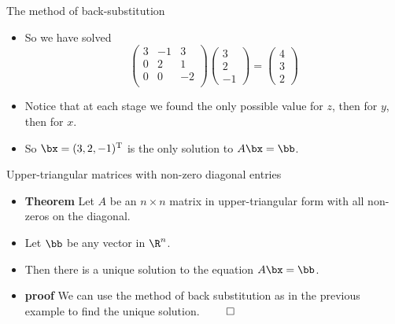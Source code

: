 \documentclass{beamer}
\begin{document}
\begin{frame}{The method of back-substitution}

\begin{itemize}
\item So we have solved
$$
\begin{pmatrix}
3 & -1  & 3 \\
0 & 2  & 1 \\
0 & 0 & -2 \\
\end{pmatrix}
\begin{pmatrix}
3 \\ 2 \\ -1
\end{pmatrix}
=
\begin{pmatrix}
4 \\ 3 \\ 2
\end{pmatrix}
$$
\item Notice that at each stage we found the only possible value for $z$,
then for $y$, then for $x$.
\item So $\bx=(3,2,-1)^{\text{T}}$ is the only solution to $A\bx=\bb$.
\end{itemize}
\end{frame}

\begin{frame}{Upper-triangular matrices with non-zero diagonal entries}

\begin{itemize}
\item \textbf{Theorem} Let $A$ be an $n\times n$ matrix in upper-triangular
form with all non-zeros on the diagonal.
\item Let $\bb$ be any vector in $\R^n$.
\item Then there is a unique solution to the equation $A\bx=\bb$.
\item \textbf{proof} We can use the method of back substitution as in the
previous example to find the unique solution. $\qed$
\end{itemize}

\end{frame}
\end{document}
